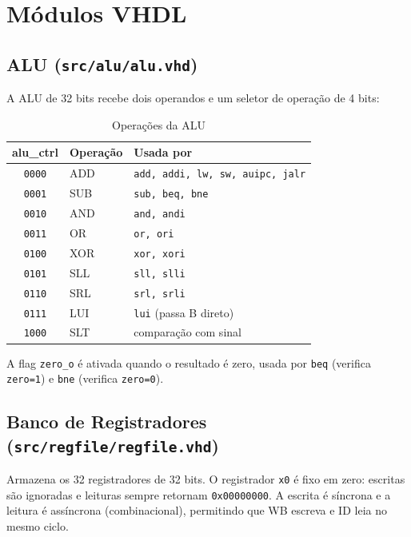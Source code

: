 \documentclass[12pt, a4paper]{article}
\newcommand{\code}[1]{\texttt{#1}}
\newcommand{\reg}[1]{\texttt{x#1}}
\begin{document}
\section{Módulos VHDL}

\subsection{ALU (\code{src/alu/alu.vhd})}

A ALU de 32 bits recebe dois operandos e um seletor de operação de 4 bits:

\begin{table}[H]
  \centering
  \caption{Operações da ALU}
  \small{}
  \begin{tabular}{cll}
    \toprule
    \rowcolor{headerblue}
    \color{white}\textbf{alu\_ctrl} & \color{white}\textbf{Operação} &
    \color{white}\textbf{Usada por} \\
    \midrule
    \code{0000} & ADD & \code{add, addi, lw, sw, auipc, jalr} \\
    \code{0001} & SUB & \code{sub, beq, bne} \\
    \code{0010} & AND & \code{and, andi} \\
    \code{0011} & OR  & \code{or, ori} \\
    \code{0100} & XOR & \code{xor, xori} \\
    \code{0101} & SLL & \code{sll, slli} \\
    \code{0110} & SRL & \code{srl, srli} \\
    \code{0111} & LUI & \code{lui} (passa B direto) \\
    \code{1000} & SLT & comparação com sinal \\
    \bottomrule
  \end{tabular}
\end{table}

A flag \code{zero\_o} é ativada quando o resultado é zero, usada por
\code{beq} (verifica \code{zero=1}) e \code{bne} (verifica \code{zero=0}).

\subsection{Banco de Registradores (\code{src/regfile/regfile.vhd})}

Armazena os 32 registradores de 32 bits. O registrador \reg{0} é fixo em zero:
escritas são ignoradas e leituras sempre retornam \code{0x00000000}. A escrita
é síncrona e a leitura é assíncrona (combinacional), permitindo que WB escreva
e ID leia no mesmo ciclo.
\end{document}
